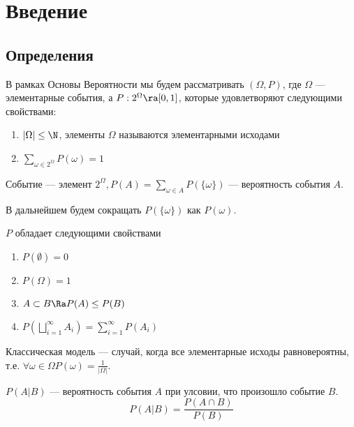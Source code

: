 
\section{Введение}
\subsection{Определения}
\begin{definition}
    В рамках Основы Вероятности мы будем рассматривать \((\Omega, P)\), где \(\Omega\) --- элементарные события, а \(P: 2^\Omega \ra [0, 1]\), которые удовлетворяют следующими свойствами:
    \begin{enumerate}
        \item \(|\Omega| \le \N\), элементы \(\Omega\) называются элементарными исходами
        \item \(\sum_{\omega \in 2^\Omega} P(\omega) = 1\)
    \end{enumerate}
\end{definition}

\begin{definition}
    Событие --- элемент \(2^\Omega, P(A) = \sum_{\omega \in A} P(\{\omega\})\) --- вероятность события \(A\).
\end{definition}

В дальнейшем будем сокращать \(P(\{\omega\})\) как \(P(\omega)\).

\begin{note}
    \(P\) обладает следующими свойствами
    \begin{enumerate}
        \item \(P(\emptyset) = 0\)
        \item \(P(\Omega) = 1\)
        \item \(A \subset B \Ra P(A) \le P(B)\)
        \item \(P\left(\bigsqcup_{i = 1}^\infty A_i\right) = \sum_{i = 1}^\infty P(A_i)\)
    \end{enumerate}
\end{note}

\begin{definition}
    Классическая модель --- случай, когда все элементарные исходы равновероятны, т.е. \(\forall \omega \in \Omega P(\omega) = \frac{1}{|\Omega|}\).
\end{definition}

\begin{definition}
    \(P(A | B)\) --- вероятность события \(A\) при улсовии, что произошло событие \(B\).
    \[P(A|B) = \frac{P(A \cap B)}{P(B)}\]
\end{definition}

